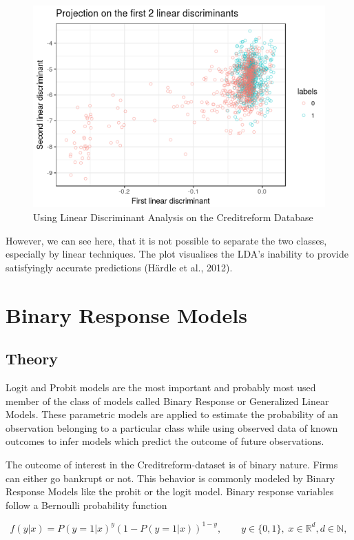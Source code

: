 \documentclass{article}
\begin{document}
\begin{figure}[b]
\caption{Using Linear Discriminant Analysis on the Creditreform Database}
\centering
\includegraphics[scale=0.5]{../LDA/creditLDA.png}
\end{figure}

However, we can see here, that it is not possible to separate the two classes, especially by linear techniques. The plot visualises the LDA's inability to provide satisfyingly accurate predictions (H{\"a}rdle et al., 2012).


\section{Binary Response Models}
\subsection{Theory}

Logit and Probit models are the most important and probably most used member of the class of models called Binary Response or Generalized Linear Models. These parametric models are applied to estimate the probability of an observation belonging to a particular class while using observed data of known outcomes to infer models which predict the outcome of future observations.

The outcome of interest in the Creditreform-dataset is of binary nature. Firms can either go bankrupt or not. This behavior is commonly modeled by Binary Response Models like the probit or the logit model. Binary response variables follow a Bernoulli probability function

\begin{equation}
f(y|x) = P(y=1|x)^y\left(1-P(y=1|x)\right)^{1-y},\qquad y\in \{0,1\},\; x\in \mathbb{R}^d, d \in \mathbb{N},
\end{equation}
\end{document}
